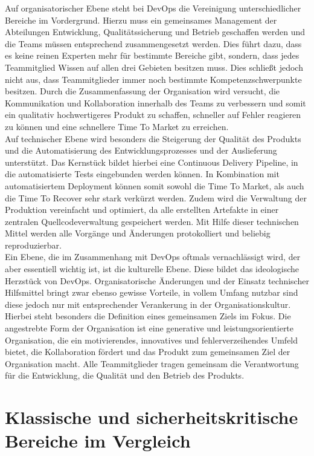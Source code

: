 Auf organisatorischer Ebene steht bei DevOps die Vereinigung unterschiedlicher Bereiche im Vordergrund. Hierzu muss ein gemeinsames Management der Abteilungen Entwicklung, Qualitätssicherung und Betrieb geschaffen werden und die Teams müssen entsprechend zusammengesetzt werden. Dies führt dazu, dass es keine reinen Experten mehr für bestimmte Bereiche gibt, sondern, dass jedes Teammitglied Wissen auf allen drei Gebieten besitzen muss. Dies schließt jedoch nicht aus, dass Teammitglieder immer noch bestimmte Kompetenzschwerpunkte besitzen. Durch die Zusammenfassung der Organisation wird versucht, die Kommunikation und Kollaboration innerhalb des Teams zu verbessern und somit ein qualitativ hochwertigeres Produkt zu schaffen, schneller auf Fehler reagieren zu können und eine schnellere Time To Market zu erreichen.\\
Auf technischer Ebene wird besonders die Steigerung der Qualität des Produkts und die Automatisierung des Entwicklungsprozesses und der Auslieferung unterstützt. Das Kernstück bildet hierbei eine Continuous Delivery Pipeline, in die automatisierte Tests eingebunden werden können. In Kombination mit automatisiertem Deployment können somit sowohl die Time To Market, als auch die Time To Recover sehr stark verkürzt werden. Zudem wird die Verwaltung der Produktion vereinfacht und optimiert, da alle erstellten Artefakte in einer zentralen Quellcodeverwaltung gespeichert werden. Mit Hilfe dieser technischen Mittel werden alle Vorgänge und Änderungen protokolliert und beliebig reproduzierbar.\\
Ein Ebene, die im Zusammenhang mit DevOps oftmals vernachlässigt wird, der aber essentiell wichtig ist, ist die kulturelle Ebene. Diese bildet das ideologische Herzstück von DevOps. Organisatorische Änderungen und der Einsatz technischer Hilfsmittel bringt zwar ebenso gewisse Vorteile, in vollem Umfang nutzbar sind diese jedoch nur mit entsprechender Verankerung in der Organisationskultur. Hierbei steht besonders die Definition eines gemeinsamen Ziels im Fokus. Die angestrebte Form der Organisation ist eine generative und leistungsorientierte Organisation, die ein motivierendes, innovatives und fehlerverzeihendes Umfeld bietet, die Kollaboration fördert und das Produkt zum gemeinsamen Ziel der Organisation macht. Alle Teammitglieder tragen gemeinsam die Verantwortung für die Entwicklung, die Qualität und den Betrieb des Produkts.

\section{Klassische und sicherheitskritische Bereiche im Vergleich} \label{sec:bereiche} %

